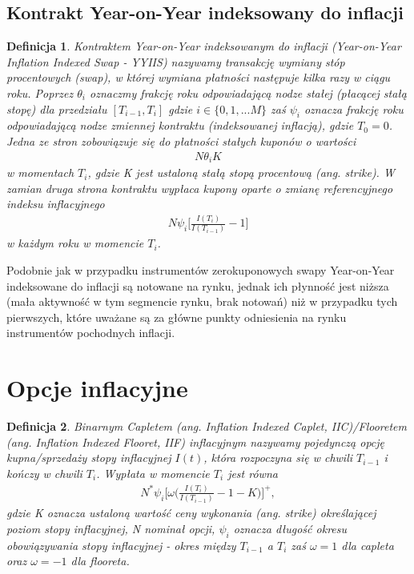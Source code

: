 \documentclass{mini}
\theoremstyle{mythstyle}
\newtheorem{Definicja}{Definicja}[chapter]
\begin{document}
	\subsection{Kontrakt Year-on-Year indeksowany do inflacji }
		
	\begin{Definicja}
	Kontraktem Year-on-Year indeksowanym do inflacji (Year-on-Year Inflation Indexed Swap - YYIIS) nazywamy transakcję wymiany stóp procentowych (swap), w której wymiana płatności następuje kilka razy w ciągu roku. Poprzez $\theta_i$ oznaczmy frakcję roku odpowiadającą nodze stałej (płacącej stałą stopę) dla przedziału $[T_{i-1},T_i]$ gdzie $i \in \{0, 1, ... M\}$ zaś $\psi_i$ oznacza frakcję roku odpowiadającą nodze zmiennej kontraktu (indeksowanej inflacją), gdzie $T_0 = 0$. Jedna ze stron zobowiązuje się do płatności stałych kuponów o wartości
	\begin{eqnarray*}
		N\theta_i K
	\end{eqnarray*}
	w momentach  $T_i$, gdzie K jest ustaloną stałą stopą procentową (ang. strike). W zamian druga strona kontraktu wypłaca kupony oparte o zmianę referencyjnego indeksu inflacyjnego
	\begin{eqnarray*}
		N\psi_i\bigg[\frac{I(T_i)}{I(T_{i-1})} - 1\bigg]
	\end{eqnarray*}
	w każdym roku w momencie $T_i$. \\
	\end{Definicja}
	
	Podobnie jak w przypadku instrumentów zerokuponowych swapy Year-on-Year indeksowane do inflacji są notowane na rynku, jednak ich płynność jest niższa (mała aktywność w tym segmencie rynku, brak notowań) niż w przypadku tych pierwszych, które uważane są za główne punkty odniesienia na rynku instrumentów pochodnych inflacji.
		
	\section{Opcje inflacyjne}
		
	\begin{Definicja}
			Binarnym Capletem (ang. Inflation Indexed Caplet, IIC)/Flooretem (ang. Inflation Indexed Flooret, IIF) inflacyjnym nazywamy pojedynczą opcję kupna/sprzedaży stopy inflacyjnej $I(t)$, która rozpoczyna się w chwili $T_{i-1}$ i kończy w chwili $T_i$.
			Wypłata w momencie $T_i$ jest równa
			\begin{eqnarray*}
				N^{*}\psi_i\bigg[\omega\bigg(\frac{I(T_i)}{I(T_{i-1})} - 1 - K \bigg)\bigg]^{+},
			\end{eqnarray*}
			gdzie K oznacza ustaloną wartość ceny wykonania (ang. strike) określającej poziom stopy inflacyjnej, N nominał opcji, $\psi_i$ oznacza długość okresu obowiązywania stopy inflacyjnej - okres między  $T_{i-1}$ a $T_i$ zaś $\omega = 1$ dla capleta oraz $\omega = -1$ dla flooreta.
	\end{Definicja}
	
\end{document}

